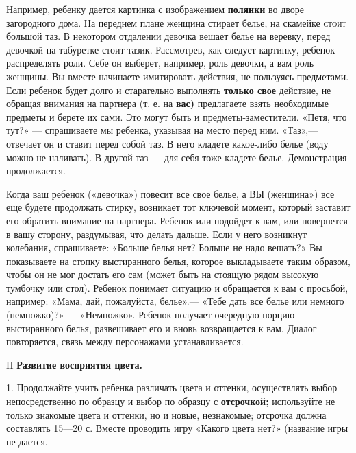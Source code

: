 \documentclass{book}
\begin{document}
Например, ребенку дается картинка с изображением \textbf{полянки} во
дворе загородного дома. На переднем плане женщина стирает белье, на
скамейке \textsc{стоит} большой таз. В некотором отдалении девочка
вешает белье на веревку, перед девочкой на табуретке стоит тазик.
Рассмотрев, как следует картинку, ребенок распределять роли. Себе он
выберет, например, роль девочки, а вам роль женщины. Вы вместе начинаете
имитировать действия, не пользуясь предметами. Если ребенок будет долго
и старательно выполнять \textbf{только свое} действие, не обращая
внимания на партнера (т. е. на \textbf{вас)} предлагаете взять
необходимые предметы и берете их сами. Это могут быть и
предметы-заместители. «Петя, что тут?» --- спрашиваете мы ребенка,
указывая на место перед ним. «Таз»,--- отвечает он и ставит перед собой
таз. В него кладете какое-либо белье (воду можно не наливать). В другой
таз --- для себя тоже кладете белье. Демонстрация продолжается.

Когда ваш ребенок («девочка») повесит все свое белье, а ВЫ (женщина»)
все еще будете продолжать стирку, возникает тот ключевой момент, который
заставит его обратить внимание на партнера\textbf{.} Ребенок или
подойдет к вам, или повернется в вашу сторону, раздумывая, что делать
дальше. Если у него возникнут колебания\textbf{,} спрашиваете: «Больше
белья нет? Больше не надо вешать?» Вы показываете на стопку выстиранного
белья, которое выкладываете таким образом, чтобы он не мог достать его
сам (может быть на стоящую рядом высокую тумбочку или стол). Ребенок
понимает ситуацию и обращается к вам с просьбой, например: «Мама, дай,
пожалуйста, белье».--- «Тебе дать все белье или немного (немножко)?» ---
«Немножко». Ребенок получает очередную порцию выстиранного белья,
развешивает его и вновь возвращается к вам. Диалог повторяется, связь
между персонажами устанавливается.

II \textbf{Развитие восприятия цвета.}

1. Продолжайте учить ребенка различать цвета и оттенки, осуществлять
выбор непосредственно по образцу и выбор по образцу с
\textbf{отсрочкой;} используйте не только знакомые цвета и оттенки, но и
новые, незнакомые; отсрочка должна составлять 15---20 с. Вместе
проводить игру «Какого цвета нет?» (название игры не дается.
\end{document}
